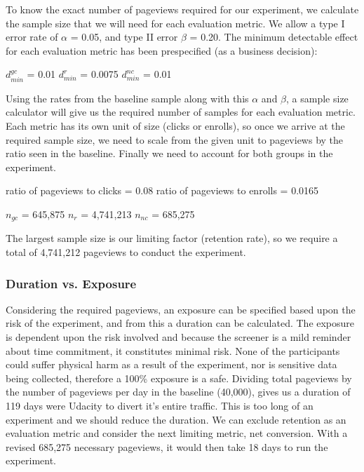 \documentclass[paper=a4, fontsize=11pt]{scrartcl} %
\numberwithin{equation}{section} %
\numberwithin{figure}{section} %
\numberwithin{table}{section} %
\begin{document}
To know the exact number of pageviews required for our experiment, we calculate the sample size that we will need for each evaluation metric.  We allow a type I error rate of $\alpha$ = 0.05, and type II error $\beta$ = 0.20.  The minimum detectable effect for each evaluation metric has been prespecified (as a business decision): \newline

$d_{min}^{gc}$ = 0.01\quad
$d_{min}^{r}$ = 0.0075\quad
$d_{min}^{nc}$ = 0.01
\newline

Using the rates from the baseline sample along with this $\alpha$ and $\beta$, a sample size calculator
will give us the required number of samples for each evaluation metric.  Each metric has it\textquotesingle s own unit of size (clicks or enrolls), so once we arrive at the required sample size, we need to scale from the given unit to pageviews by the ratio seen in the baseline.  Finally we need to account for both groups in the experiment. \newline

ratio of pageviews to clicks = 0.08 \newline
ratio of pageviews to enrolls = 0.0165 \newline

$n_{gc}$ = 645,875\quad
$n_{r}$ = 4,741,213\quad
$n_{nc}$ = 685,275
\newline

The largest sample size is our limiting factor (retention rate), so we require a total of 4,741,212 pageviews to conduct the experiment. \newline


\subsubsection{Duration vs. Exposure}


Considering the required pageviews, an exposure can be specified based upon the risk of the experiment, and from this a duration can be calculated.  The exposure is dependent upon the risk involved and because the screener is a mild reminder about time commitment, it constitutes minimal risk.  None of the participants could suffer physical harm as a result of the experiment, nor is sensitive data being collected, therefore a 100\% exposure is a safe.  Dividing total pageviews by the number of pageviews per day in the baseline (40,000), gives us a duration of 119 days were Udacity to divert it's entire traffic.  This is too long of an experiment and we should reduce the duration.  We can exclude retention as an evaluation metric and consider the next limiting metric, net conversion.  With a revised 685,275 necessary pageviews, it would then take 18 days to run the experiment. \newline
\end{document}
